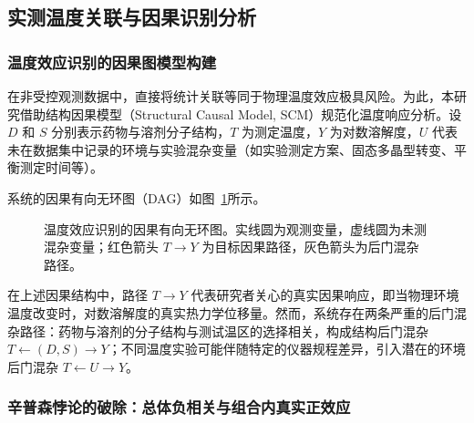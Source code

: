 \subsection{实测温度关联与因果识别分析}\label{sec:temperature-association}

\subsubsection{温度效应识别的因果图模型构建}

在非受控观测数据中，直接将统计关联等同于物理温度效应极具风险。为此，本研究借助结构因果模型（Structural Causal Model, SCM）规范化温度响应分析\cite{pearl2009}。设 $D$ 和 $S$ 分别表示药物与溶剂分子结构，$T$ 为测定温度，$Y$ 为对数溶解度，$U$ 代表未在数据集中记录的环境与实验混杂变量（如实验测定方案、固态多晶型转变、平衡测定时间等）。

系统的因果有向无环图（DAG）如图~\ref{fig:causal-dag}所示。
\begin{figure}[htbp]
\centering
{}
\caption{温度效应识别的因果有向无环图。实线圆为观测变量，虚线圆为未测混杂变量；红色箭头 $T \to Y$ 为目标因果路径，灰色箭头为后门混杂路径。}
\label{fig:causal-dag}
\end{figure}
在上述因果结构中，路径 $T \to Y$ 代表研究者关心的真实因果响应，即当物理环境温度改变时，对数溶解度的真实热力学位移量。然而，系统存在两条严重的后门混杂路径：药物与溶剂的分子结构与测试温区的选择相关，构成结构后门混杂 $T \leftarrow (D, S) \to Y$；不同温度实验可能伴随特定的仪器规程差异，引入潜在的环境后门混杂 $T \leftarrow U \to Y$。

\subsubsection{辛普森悖论的破除：总体负相关与组合内真实正效应}

